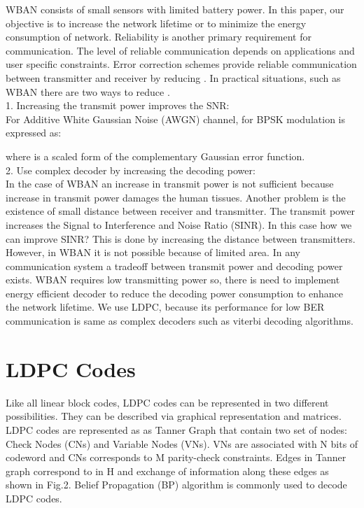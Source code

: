 \documentclass[3p,times,procedia]{elsarticle}
\begin{document}
WBAN consists of small sensors with limited battery power. In this paper, our objective is to increase the network lifetime or to minimize the energy consumption of network. Reliability is another primary requirement for communication. The level of reliable communication depends on applications and user specific constraints. Error correction schemes provide reliable communication between transmitter and receiver by reducing . In practical situations, such as WBAN there are two ways to reduce .\\
1. Increasing the transmit power improves the SNR:\\
For Additive White Gaussian Noise (AWGN) channel,  for BPSK modulation is expressed as:

where  is a scaled form of the complementary Gaussian error function.\\
2. Use complex decoder by increasing the decoding power:\\
In the case of WBAN an increase in transmit power is not sufficient because increase in transmit power damages the human tissues. Another problem is the existence of small distance between receiver and transmitter. The transmit power increases the Signal to Interference and Noise Ratio (SINR). In this case how we can improve SINR? This is done by increasing the distance between transmitters. However, in WBAN it is not possible because of limited area. In any communication system a tradeoff between transmit power and decoding power exists. WBAN requires low transmitting power so, there is need to implement energy efficient decoder to reduce the decoding power consumption to enhance the network lifetime. We use LDPC, because its performance for low BER communication is same as complex decoders such as viterbi decoding algorithms.

\vspace{-0.5cm}
\section{LDPC Codes}
\vspace{-0.3cm}
\label{sec:pagestyle}


Like all linear block codes, LDPC codes can be represented in two different possibilities. They  can be described via graphical representation and matrices. LDPC codes are represented as as Tanner Graph that contain two set of nodes: Check Nodes (CNs) and Variable Nodes (VNs). VNs are associated with N bits of codeword and CNs corresponds to M parity-check constraints. Edges in Tanner graph correspond to  in H and exchange of information along these edges as shown in Fig.2. Belief Propagation (BP) algorithm is commonly used to decode LDPC codes.
\end{document}
